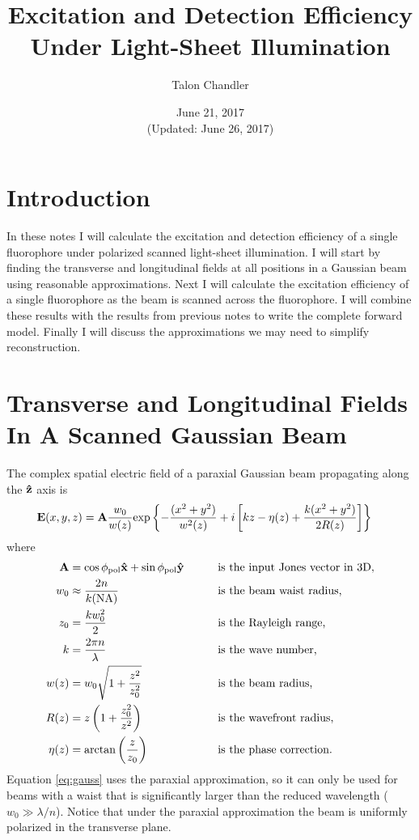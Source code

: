 \documentclass[11pt]{article}
\begin{document}
\title{\vspace{-2.5em} Excitation and Detection Efficiency Under Light-Sheet
  Illumination \vspace{-1.0em}} \author{Talon Chandler}
\date{\vspace{-1em}June 21, 2017\\ (Updated: June 26, 2017)\vspace{-1em}}
\maketitle
\section{Introduction}
In these notes I will calculate the excitation and detection efficiency of a
single fluorophore under polarized scanned light-sheet illumination. I will
start by finding the transverse and longitudinal fields at all positions in a
Gaussian beam using reasonable approximations. Next I will calculate the
excitation efficiency of a single fluorophore as the beam is scanned across the
fluorophore. I will combine these results with the results from previous notes
to write the complete forward model. Finally I will discuss the approximations
we may need to simplify reconstruction.

\section{Transverse and Longitudinal Fields In A Scanned Gaussian Beam}
The complex spatial electric field of a paraxial Gaussian beam propagating along the
$\mathbf{\hat{z}}$ axis is \cite{nov}
\begin{align}
  \mathbf{E}(x,y,z) &= \mathbf{A}\frac{w_0}{w(z)}\text{exp}\left\{{-\frac{(x^2+y^2)}{w^2(z)}}+i\left[kz - \eta(z) + \frac{k(x^2+y^2)}{2R(z)}\right]\right\}\label{eq:gauss}
\end{align}
where
\begin{alignat}{2}  
  \mathbf{A} &= \cos\phi_{\text{pol}}\mathbf{\hat{x}} + \sin\phi_{\text{pol}}\mathbf{\hat{y}}\qquad &&\text{is the input Jones vector in 3D},\\
  w_0 &\approx \frac{2n}{k(\text{NA})}\qquad &&\text{is the beam waist radius,}\\
  z_0 &= \frac{kw_0^2}{2} &&\text{is the Rayleigh range,}\\
  k &= \frac{2\pi n}{\lambda}\qquad &&\text{is the wave number,}\\
  w(z) &= w_0\sqrt{1+\frac{z^2}{z_0^2}}\qquad &&\text{is the beam radius,}\\  
  R(z) &= z\left(1+\frac{z_0^2}{z^2}\right)\qquad &&\text{is the wavefront radius,}\\
  \eta(z) &= \text{arctan}\left(\frac{z}{z_0}\right)\qquad &&\text{is the phase correction.}
\end{alignat}
Equation \ref{eq:gauss} uses the paraxial approximation, so it can only be used
for beams with a waist that is significantly larger than the reduced wavelength
($w_0 \gg \lambda/n$). Notice that under the paraxial approximation the beam is uniformly polarized in the transverse plane.
\end{document}
